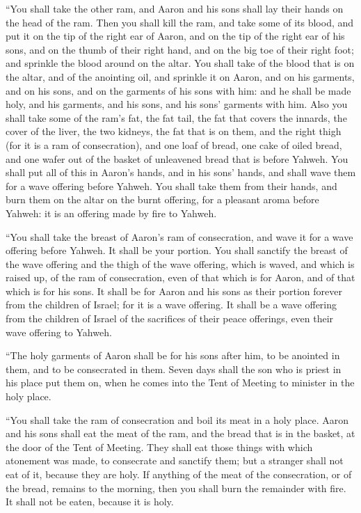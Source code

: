  ``You shall take the other ram, and Aaron and his sons
shall lay their hands on the head of the ram.  Then you
shall kill the ram, and take some of its blood, and put it on the tip of
the right ear of Aaron, and on the tip of the right ear of his sons, and
on the thumb of their right hand, and on the big toe of their right
foot; and sprinkle the blood around on the altar.  You
shall take of the blood that is on the altar, and of the anointing oil,
and sprinkle it on Aaron, and on his garments, and on his sons, and on
the garments of his sons with him: and he shall be made holy, and his
garments, and his sons, and his sons' garments with him. 
Also you shall take some of the ram's fat, the fat tail, the fat that
covers the innards, the cover of the liver, the two kidneys, the fat
that is on them, and the right thigh (for it is a ram of consecration),
 and one loaf of bread, one cake of oiled bread, and one
wafer out of the basket of unleavened bread that is before Yahweh.
 You shall put all of this in Aaron's hands, and in his
sons' hands, and shall wave them for a wave offering before Yahweh.
 You shall take them from their hands, and burn them on
the altar on the burnt offering, for a pleasant aroma before Yahweh: it
is an offering made by fire to Yahweh.

 ``You shall take the breast of Aaron's ram of
consecration, and wave it for a wave offering before Yahweh. It shall be
your portion.  You shall sanctify the breast of the wave
offering and the thigh of the wave offering, which is waved, and which
is raised up, of the ram of consecration, even of that which is for
Aaron, and of that which is for his sons.  It shall be
for Aaron and his sons as their portion forever from the children of
Israel; for it is a wave offering. It shall be a wave offering from the
children of Israel of the sacrifices of their peace offerings, even
their wave offering to Yahweh.

 ``The holy garments of Aaron shall be for his sons after
him, to be anointed in them, and to be consecrated in them.
 Seven days shall the son who is priest in his place put
them on, when he comes into the Tent of Meeting to minister in the holy
place.

 ``You shall take the ram of consecration and boil its
meat in a holy place.  Aaron and his sons shall eat the
meat of the ram, and the bread that is in the basket, at the door of the
Tent of Meeting.  They shall eat those things with which
atonement was made, to consecrate and sanctify them; but a stranger
shall not eat of it, because they are holy.  If anything
of the meat of the consecration, or of the bread, remains to the
morning, then you shall burn the remainder with fire. It shall not be
eaten, because it is holy.


